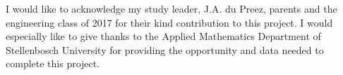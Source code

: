 

\begin{acknowledgements}      %
I would like to acknowledge my study leader, J.A. du Preez, parents and the engineering class of 2017 for their kind contribution to this project. I would especially like to give thanks to the Applied Mathematics Department of Stellenbosch University for providing the opportunity and data needed to complete this project.
\end{acknowledgements}

